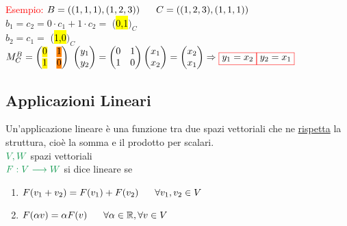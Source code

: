 \textcolor{red}{Esempio: } $B = ((1,1,1),(1,2,3)) \hspace{0.6cm} C = ((1,2,3),(1,1,1))$\\
$b_1 = c_2 = 0 \cdot c_ 1 + 1 \cdot c_2 =$ (\hl{0,1}$)_C$\\
$b_2 = c_1 =$ (\hl{1,0}$)_C$\\
\(
M^B_{C} =
\begin{pmatrix}
	$\sethlcolor{yellow}\hl{0}$ & $\sethlcolor{orange}\hl{1}$ \\
	$\sethlcolor{yellow}\hl{1}$ & $\sethlcolor{orange}\hl{0}$ \\
\end{pmatrix}
\)
\(
\begin{pmatrix}
	y_1 \\
	y_2
\end{pmatrix}
=
\begin{pmatrix}
	0 & 1 \\
	1 & 0
\end{pmatrix}
\begin{pmatrix}
	x_1 \\
	x_2
\end{pmatrix}
=
\begin{pmatrix}
	x_2 \\
	x_1
\end{pmatrix}
\Rightarrow
\color{red}\boxed{\normalcolor y_1 = x_2}
\boxed{\normalcolor y_2 = x_1} \normalcolor
\)


\newpage

\subsection{Applicazioni Lineari}

\begin{definition}
	Un'applicazione lineare è una funzione tra due spazi vettoriali che ne \color{ForestGreen}\underline{\normalcolor rispetta} \normalcolor la struttura, cioè la somma e il prodotto per scalari. \\
	$\color{ForestGreen} V, W $ \normalcolor  spazi vettoriali \\
	$\color{ForestGreen} F:V \longrightarrow W $ \normalcolor  si dice \color{ForestGreen} lineare \normalcolor se \\
	\begin{enumerate}
		\item $F(v_1 + v_2) = F(v_1) + F(v_2) \hspace{0.6cm} \forall v_1, v_2 \in V$
		\item $F(\alpha v) = \alpha F(v) \hspace{0.6cm} \forall \alpha \in \mathbb{R}, \forall v \in V$
	\end{enumerate}
\end{definition}

